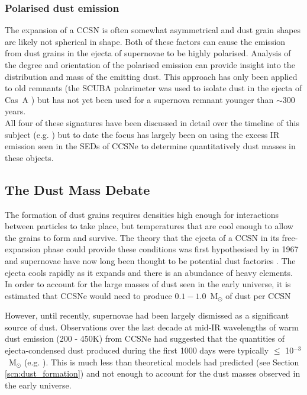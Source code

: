 \subsubsection{Polarised dust emission}
The expansion of a CCSN is often somewhat asymmetrical and dust grain shapes are likely not spherical in shape.  Both of these factors can cause the emission from dust grains in the ejecta of supernovae to be highly polarised.  Analysis of the degree and orientation of the polarised emission can provide insight into the distribution and mass of the emitting dust.  This approach has only been applied to old remnants (the SCUBA polarimeter was used to isolate dust in the ejecta of Cas~A \citep{Dunne2009}) but has not yet been used for a supernova remnant younger than $\sim$300 years.
\\

\noindent All four of these signatures have been discussed in detail over the timeline of this subject (e.g. \citealt{Danziger1991,Bouchet1991,Bouchet1993,Sugerman2006,Gomez2013}) but to date the focus has largely been on using the excess IR emission seen in the SEDs of CCSNe to determine quantitatively dust masses in these objects.  
 

\subsection{The Dust Mass Debate}

The formation of dust grains requires densities high enough for interactions between particles to take place, but temperatures that are cool enough to allow the grains to form and survive.  The theory that the ejecta of a CCSN in its free-expansion phase could provide these conditions  was first hypothesised by \citeauthor{Cernuschi1967} in 1967 and supernovae have now long been thought to be potential dust factories \citep{Hoyle1970, Kozasa1991, Todini2001,Nozawa2003,Cherchneff2010,Sarangi2013,Biscaro2014}.  The ejecta cools rapidly as it expands and there is an abundance of heavy elements.  In order to account for the large masses of dust seen in the early universe, it is estimated that CCSNe would need to produce  $0.1-1.0$~M$_\odot$ of dust per CCSN  \citep{Morgan2003, Dwek2007}

However, until recently, supernovae had been largely dismissed as a significant source of dust.  Observations over the last decade at mid-IR wavelengths of warm dust emission (200 - 450K)  from CCSNe had suggested that the quantities of ejecta-condensed dust produced during the first 1000 days were typically $\leq$ 10$^{-3}$~M$_\odot$  (e.g. \citealt{Sugerman2006, Meikle2007, Kotak2009, Andrews2010, Fabbri2011}).  This is much less than theoretical models had predicted (see Section \ref{scn:dust_formation}) and not enough to account for the dust masses observed in the early universe.  

